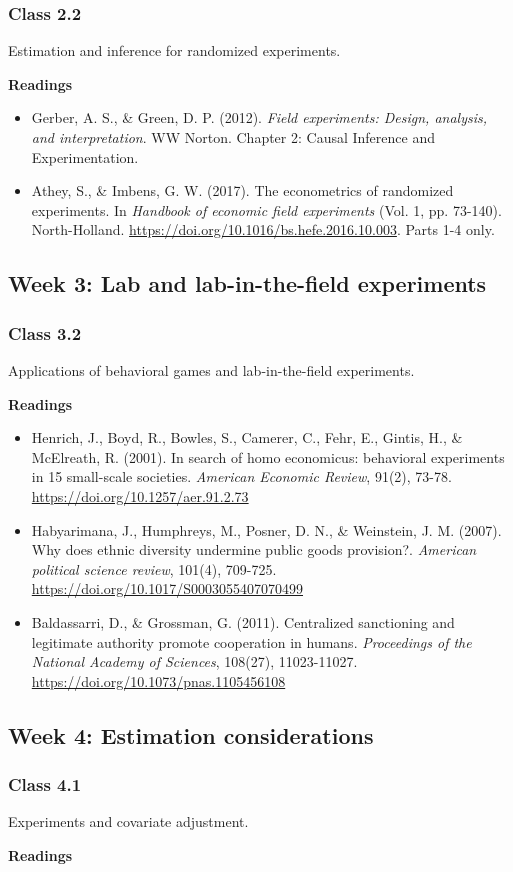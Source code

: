 \documentclass[letterpaper,12pt,parskip=full,DIV=10]{scrartcl}
\newcommand{\courseweek}[2]{\Needspace{12\baselineskip}\subsection*{Week #1: #2}}
\newcommand{\class}[2]{\Needspace{9\baselineskip}\subsubsection*{Class #1}\nopagebreak #2\par\nopagebreak\textbf{Readings}\par\nopagebreak}
\begin{document}
\class{2.2}{Estimation and inference for randomized experiments.}

\begin{itemize}

\item Gerber, A. S., \& Green, D. P. (2012). \emph{Field experiments: Design, analysis, and interpretation}. WW Norton. Chapter 2: Causal Inference and Experimentation.

\item Athey, S., \& Imbens, G. W. (2017). The econometrics of randomized experiments. In \emph{Handbook of economic field experiments} (Vol. 1, pp. 73-140). North-Holland. \url{https://doi.org/10.1016/bs.hefe.2016.10.003}. Parts 1-4 only.

\end{itemize}

\courseweek{3}{Lab and lab-in-the-field experiments}

\class{3.2}{Applications of behavioral games and lab-in-the-field experiments.}

\begin{itemize}

\item Henrich, J., Boyd, R., Bowles, S., Camerer, C., Fehr, E., Gintis, H., \& McElreath, R. (2001). In search of homo economicus: behavioral experiments in 15 small-scale societies. \emph{American Economic Review}, 91(2), 73-78. \url{https://doi.org/10.1257/aer.91.2.73}

\item Habyarimana, J., Humphreys, M., Posner, D. N., \& Weinstein, J. M. (2007). Why does ethnic diversity undermine public goods provision?. \emph{American political science review}, 101(4), 709-725. \url{https://doi.org/10.1017/S0003055407070499}

\item Baldassarri, D., \& Grossman, G. (2011). Centralized sanctioning and legitimate authority promote cooperation in humans. \emph{Proceedings of the National Academy of Sciences}, 108(27), 11023-11027. \url{https://doi.org/10.1073/pnas.1105456108}

\end{itemize}

\courseweek{4}{Estimation considerations}

\class{4.1}{Experiments and covariate adjustment.}
\end{document}

